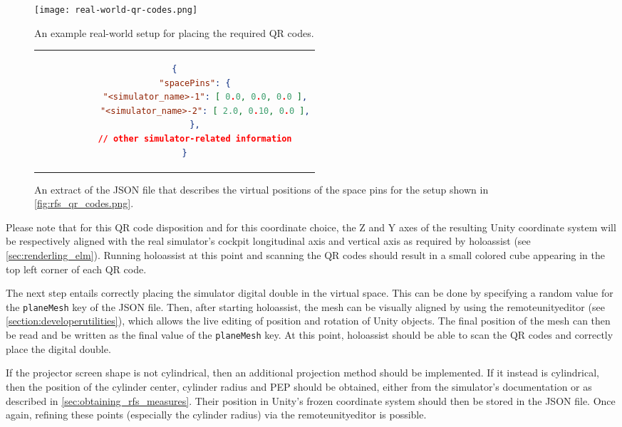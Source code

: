 \begin{figure}
  \centering
  \texttt{[image: real-world-qr-codes.png]}
  \caption{An example real-world setup for placing the required QR codes.}\label{fig:rfs_qr_codes.png}
\end{figure}

\begin{figure}
  \centering
  \begin{tabular}{c}
  \begin{lstlisting}[language=json]
    {
        "spacePins": {
            "<simulator_name>-1": [ 0.0, 0.0, 0.0 ],
            "<simulator_name>-2": [ 2.0, 0.10, 0.0 ],
        },
        // other simulator-related information
    }
  \end{lstlisting}
  \end{tabular}
  \caption{An extract of the JSON file that describes the virtual positions of the space pins for the setup shown in \autoref{fig:rfs_qr_codes.png}.}\label{lst:space_pins_virtual_positions_example_json}
\end{figure}

Please note that for this QR code disposition and for this coordinate choice, the Z and Y axes of the resulting Unity coordinate system will be respectively aligned with the real simulator's cockpit longitudinal axis and vertical axis as required by \gls{holoassist} (see \autoref{sec:renderling_elm}). Running \gls{holoassist} at this point and scanning the QR codes should result in a small colored cube appearing in the top left corner of each QR code.

The next step entails correctly placing the simulator digital double in the virtual space. This can be done by specifying a random value for the \texttt{planeMesh} key of the JSON file. Then, after starting \gls{holoassist}, the mesh can be visually aligned by using the \gls{remoteunityeditor} (see \autoref{section:developerutilities}), which allows the live editing of position and rotation of Unity objects. The final position of the mesh can then be read and be written as the final value of the \texttt{planeMesh} key. At this point, \gls{holoassist} should be able to scan the QR codes and correctly place the digital double.

If the projector screen shape is not cylindrical, then an additional projection method should be implemented. If it instead is cylindrical, then the position of the cylinder center, cylinder radius and \gls{PEP} should be obtained, either from the simulator's documentation or as described in \autoref{sec:obtaining_rfs_measures}. Their position in Unity's frozen coordinate system should then be stored in the JSON file. Once again, refining these points (especially the cylinder radius) via the \gls{remoteunityeditor} is possible.

